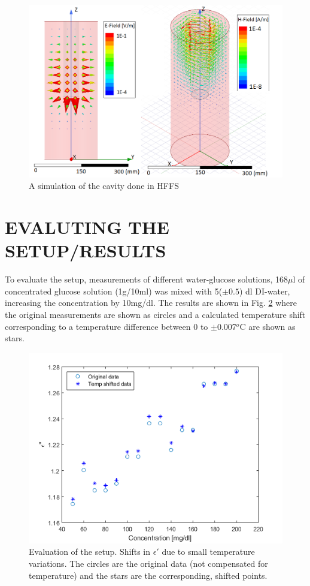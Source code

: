 \documentclass[10pt,final,conference,a4paper,twocolumn]{IEEEtran_AntennEMB_GigaHertz2016}
\begin{document}
 \begin{figure}[b]
 	\centering
 	\includegraphics[width=1.0\columnwidth]{EHfield.png}
 	\caption{A simulation of the cavity done in HFFS}
 	\label{fig:sim}
 \end{figure}

\section{EVALUTING THE SETUP/RESULTS}
To evaluate the setup, measurements of different water-glucose solutions, 168$\mu$l of concentrated glucose solution (1g/10ml) was mixed with 5($\pm0.5$) dl DI-water, increasing the concentration by 10mg/dl. The results are shown in Fig. \ref{fig:eim} where the original measurements are shown as circles and a calculated temperature shift corresponding to a temperature difference between 0 to $\pm$0.007$^o$C are shown as stars.
\begin{figure}[t]
	\centering
	\includegraphics[width=1.0\columnwidth]{pumpgluzoomEIM.png}
	\caption{Evaluation of the setup. Shifts in $\epsilon'$ due to small temperature variations. The circles are the original data (not compensated for temperature) and the stars are the corresponding, shifted points.}
	\label{fig:eim}
\end{figure}
\end{document}
